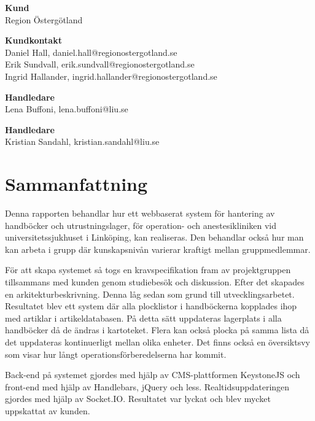 \documentclass{article}
\begin{document}
\begin{flushleft}
\textbf{Kund} \\ Region Östergötland \\
\end{flushleft}
\begin{flushleft}
\textbf{Kundkontakt} \\ 
Daniel Hall, daniel.hall@regionostergotland.se \\
Erik Sundvall, erik.sundvall@regionostergotland.se \\
Ingrid Hallander, ingrid.hallander@regionostergotland.se \\
\end{flushleft}
\begin{flushleft}
\textbf{Handledare} \\ Lena Buffoni, lena.buffoni@liu.se \\
\end{flushleft}
\begin{flushleft}
\textbf{Handledare} \\ Kristian Sandahl, kristian.sandahl@liu.se \\
\end{flushleft}
\newpage
\section*{Sammanfattning}
Denna rapporten behandlar hur ett webbaserat system för hantering av handböcker och utrustningslager, för operation- och anestesikliniken vid universitetssjukhuset i Linköping, kan realiseras. Den behandlar också hur man kan arbeta i grupp där kunskapsnivån varierar kraftigt mellan gruppmedlemmar. 

För att skapa systemet så togs en kravspecifikation fram av projektgruppen tillsammans med kunden genom studiebesök och diskussion.  Efter det skapades en arkitekturbeskrivning. Denna låg sedan som grund till utvecklingsarbetet. Resultatet blev ett system där alla plocklistor i handböckerna kopplades ihop med artiklar i artikeldatabasen. På detta sätt uppdateras lagerplats i alla handböcker då de ändras i kartoteket. Flera kan också plocka på samma lista då det uppdateras kontinuerligt mellan olika enheter. Det finns också en översiktsvy som visar hur långt operationsförberedelserna har kommit.  

Back-end på systemet gjordes med hjälp av CMS-plattformen KeystoneJS och front-end med hjälp av Handlebars, jQuery och less. Realtidsuppdateringen gjordes med hjälp av Socket.IO. Resultatet var lyckat och blev mycket uppskattat av kunden.
\end{document}
